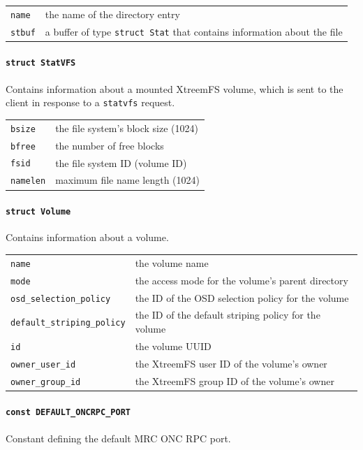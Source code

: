 \begin{tabularx}{\textwidth}{lX}
 \texttt{name} & the name of the directory entry\\
 \texttt{stbuf} & a buffer of type \texttt{struct Stat} that contains information about the file\\
\end{tabularx}

\paragraph{\texttt{struct StatVFS}}
Contains information about a mounted XtreemFS volume, which is sent to the client in response to a \texttt{statvfs} request.

\begin{tabularx}{\textwidth}{lX}
 \texttt{bsize} & the file system's block size (1024)\\
 \texttt{bfree} & the number of free blocks\\
 \texttt{fsid} & the file system ID (volume ID)\\
 \texttt{namelen} & maximum file name length (1024)\\
\end{tabularx}

\paragraph{\texttt{struct Volume}}
Contains information about a volume.

\begin{tabularx}{\textwidth}{lX}
 \texttt{name} & the volume name\\
 \texttt{mode} & the access mode for the volume's parent directory\\
 \texttt{osd\_selection\_policy} & the ID of the OSD\index{OSD} selection policy for the volume\\
 \texttt{default\_striping\_policy} & the ID of the default striping policy for the volume\\
 \texttt{id} & the volume UUID\\
 \texttt{owner\_user\_id} & the XtreemFS user ID of the volume's owner\\
 \texttt{owner\_group\_id} & the XtreemFS group ID of the volume's owner\\
\end{tabularx}

\paragraph{\texttt{const DEFAULT\_ONCRPC\_PORT}}
Constant defining the default MRC ONC RPC port.

